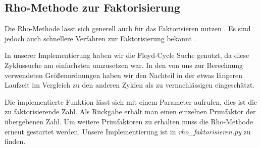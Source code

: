 \documentclass{scrartcl}
\begin{document}
\subsection{Rho-Methode zur Faktorisierung}
\label{sec:rho_faktorisieren}
Die Rho-Methode lässt sich generell auch für das Faktorisieren nutzen \cite{Pollard1975}.
Es sind jedoch auch schnellere Verfahren zur Faktorisierung bekannt \cite{ECM,QS,NFS}.

In unserer Implementierung haben wir die Floyd-Cycle Suche genutzt,
da diese Zyklussuche am einfachsten umzusetzen war.
In den von uns zur Berechnung verwendeten Größenordnungen haben wir den Nachteil in der
etwas längeren Laufzeit im Vergleich zu den anderen Zyklen als zu vernachlässigen
eingeschätzt.

Die implementierte Funktion lässt sich mit einem Parameter aufrufen, dies ist die zu faktorisierende Zahl.
Als Rückgabe erhält man einen einzelnen Primfaktor der übergebenen Zahl.
Um weitere Primfaktoren zu erhalten muss die Rho-Methode erneut gestartet werden.
Unsere Implementierung ist in \emph{rho\_faktorisieren.py} zu finden.

\ \\
\printbibliography[heading=bibintoc]
\end{document}
